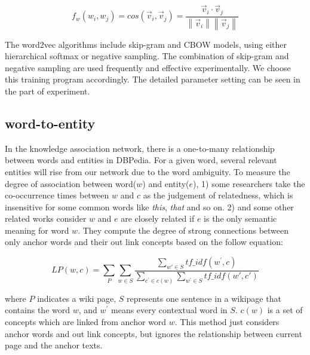 \begin{small}
    \begin{equation}
        \label{cos}
        f_w(w_i, w_j) = cos(\overrightarrow v_i,\overrightarrow v_j) = \frac{\overrightarrow v_i \cdot 
        \overrightarrow v_j}{\left \| \overrightarrow v_i \right \|\left \| \overrightarrow v_j \right \|}
    \end{equation}
\end{small}

The word2vec algorithms include skip-gram and CBOW models, using either hierarchical softmax or negative sampling.
The combination of skip-gram and negative sampling are used frequently and effective experimentally. We choose this
training program accordingly. The detailed parameter setting can be seen in the part of experiment.

\subsection{word-to-entity}
In the knowledge association network, there is a one-to-many relationship between words and entities in DBPedia.
For a given word, several relevant entities will rise from our network due to the word ambiguity.
To measure the degree of association between word($w$) and entity($e$), 1) some researchers\cite{aaai/Pirro12}
take the co-occurrence times between $w$ and $c$ as the judgement of relatedness,
which is insensitive for some common words like \emph{this}, \emph{that} and so on. 
2) and some other related works\cite{aaai/GongXH18} consider $w$ and $e$ are closely related if $e$ is the
only semantic meaning for word $w$. They compute the degree of strong connections between only anchor words and
their out link concepts based on the follow equation:

\begin{small}
    \begin{equation}
        \label{lp_link}
        LP(w, c) = \sum_{P}^{ }\sum_{w \in S}^{ } \frac{\sum_{w{'} \in S}^{ }tf\_idf(w^{'},c)}
        {\sum_{c^{'} \in c(w)}^{ }\sum_{w^{'} \in S}^{ }tf\_idf(w{'}, c{'})}
    \end{equation}
\end{small}where $P$ indicates a wiki page, $S$ represents one sentence in a wikipage that contains the word $w$, and
$w^{'}$ means every contextual word in $S$. $c(w)$ is a set of concepts which are linked from anchor word $w$. This method
just considers anchor words and out link concepts, but ignores the relationship between current page and the anchor texts.

